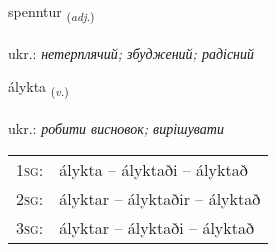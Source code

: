 \documentclass[frontgrid, backgrid]{flacards}\usepackage[]{graphicx}\usepackage[]{xcolor}
\begin{document}
\renewcommand{\flhead}{\vskip5pt \fboxsep=0pt {\small\bfseries\footnotesize Lýsingarorð | прикметник}}
\renewcommand{\fcfoot}{\vskip5pt \fboxsep=0pt \hspace{2pt}{\small\bfseries\footnotesize 3K}}

\renewcommand{\blhead}{\vskip5pt {\small\bfseries\footnotesize Lýsingarorð | прикметник }}
\renewcommand{\bcfoot}{\vskip5pt \hspace{2pt}{\small\bfseries\footnotesize 3K}}


{spenntur \small{\textsubscript{(\textit{adj.})}} \\[1ex] %
 \\
ukr.: \emph{нетерплячий; збуджений; радісний} \\  [2ex]
\renewcommand*{\arraystretch}{0.8}
}

\renewcommand{\flhead}{\vskip5pt \fboxsep=0pt {\small\bfseries\footnotesize Sagnorð | дієслово}}
\renewcommand{\fcfoot}{\vskip5pt \fboxsep=0pt \hspace{2pt}{\small\bfseries\footnotesize 3K}}

\renewcommand{\blhead}{\vskip5pt {\small\bfseries\footnotesize Sagnorð | дієслово }}
\renewcommand{\bcfoot}{\vskip5pt \hspace{2pt}{\small\bfseries\footnotesize 3K}}


{álykta \small{\textsubscript{(\textit{v.})}} \\[1ex] %
\textphonetic{[auːlɪxta]} \\
ukr.: \emph{робити висновок; вирішувати} \\  [2ex]
\renewcommand*{\arraystretch}{0.8}
\begin{tabular}{p{1cm}l}
\textsc{1sg}: & álykta -- ályktaði -- ályktað \\ 
\textsc{2sg}: & ályktar -- ályktaðir -- ályktað \\ 
\textsc{3sg}: & ályktar -- ályktaði -- ályktað \\ 
\end{tabular}
}
\end{document}

